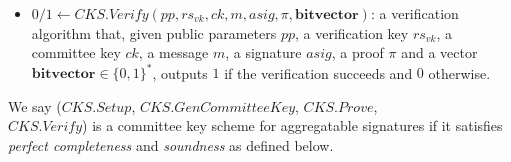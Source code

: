 \begin{definition}
\begin{itemize}
\item $0/1 \leftarrow \mathit{CKS.Verify}(\mathit{pp}, \mathit{rs}_{\mathit{vk}}, \mathit{ck}, m, \mathit{asig}, \pi, \mathbf{bitvector})$: a verification algorithm that, 
given public parameters $\mathit{pp}$, a verification key $\mathit{rs}_{\mathit{vk}}$, a committee key $\mathit{ck}$, a message $m$, a 
signature $\mathit{asig}$, a proof $\pi$ and a vector $\mathbf{bitvector} \in \{0,1\}^*$, 
outputs $1$ if the verification succeeds and $0$ otherwise. 
\end{itemize}

\noindent We say ($\mathit{CKS.Setup}$, $\mathit{CKS.GenCommitteeKey}$, $\mathit{CKS.Prove}$, \\$\mathit{CKS.Verify}$) 
is a committee key scheme for aggregatable signatures if it satisfies \emph{perfect completeness} and 
\emph{soundness} as defined below.


\end{definition}

